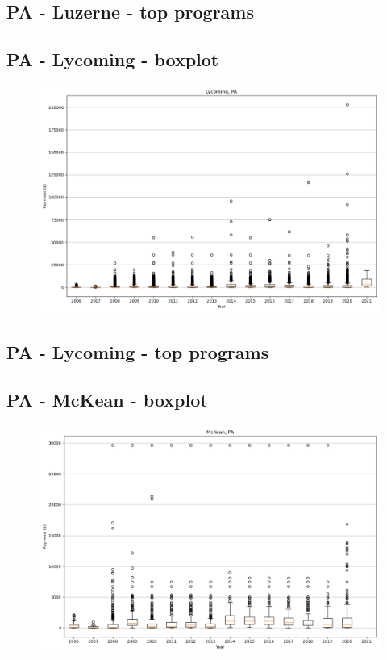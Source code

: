 \subsection*{PA - Luzerne - top programs}

\newpage
\subsection*{PA - Lycoming - boxplot}
\begin{figure}[h]
\centering
\includegraphics[width=7in]{../output/boxplots/counties/Lycoming-PA_boxplot.png}
\end{figure}


\subsection*{PA - Lycoming - top programs}

\newpage
\subsection*{PA - McKean - boxplot}
\begin{figure}[h]
\centering
\includegraphics[width=7in]{../output/boxplots/counties/McKean-PA_boxplot.png}
\end{figure}


